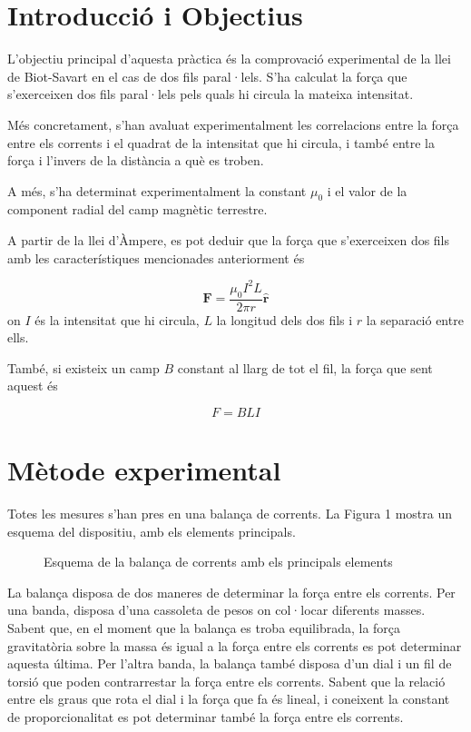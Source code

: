 \begin{multicols}{2}
	\section{Introducció i Objectius}
	L'objectiu principal d'aquesta pràctica és la comprovació experimental de la llei de Biot-Savart en el cas de dos fils paral·lels. S'ha calculat la força que s'exerceixen dos fils paral·lels pels quals hi circula la mateixa intensitat.

	Més concretament, s'han avaluat experimentalment les correlacions entre la força entre els corrents i el quadrat de la intensitat que hi circula, i també entre la força i l'invers de la distància a què es troben.

	A més, s'ha determinat experimentalment la constant $\mu_0$ i el valor de la component radial del camp magnètic terrestre.

	A partir de la llei d'Àmpere, es pot deduir que la força que s'exerceixen dos fils amb les característiques mencionades anteriorment és 

	\begin{equation}
		\mathbf{F}=\frac{\mu_0I^2L}{2\pi r} \hat{ \mathbf{r} } 
	\end{equation}
	on $I$ és la intensitat que hi circula, $L$ la longitud dels dos fils i $r$ la separació entre ells.

	També, si existeix un camp $B$ constant al llarg de tot el fil, la força que sent aquest és

	\begin{equation}
		F=BLI
	\end{equation}

	\section{Mètode experimental}
	Totes les mesures s'han pres en una balança de corrents. La Figura 1 mostra un esquema del dispositiu, amb els elements principals.
	\begin{figure}
		\centering
		\caption{Esquema de la balança de corrents amb els principals elements}
	\end{figure}

	La balança disposa de dos maneres de determinar la força entre els corrents. Per una banda, disposa d'una cassoleta de pesos on col·locar diferents masses. Sabent que, en el moment que la balança es troba equilibrada, la força gravitatòria sobre la massa és igual a la força entre els corrents es pot determinar aquesta última. Per l'altra banda, la balança també disposa d'un dial i un fil de torsió que poden contrarrestar la força entre els corrents. Sabent que la relació entre els graus que rota el dial i la força que fa és lineal, i coneixent la constant de proporcionalitat es pot determinar també la força entre els corrents.


\end{multicols}
